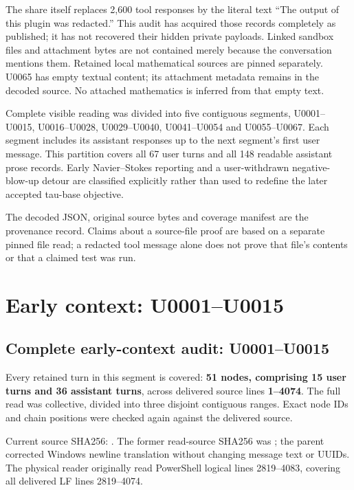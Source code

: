 \documentclass[10pt,a4paper,oneside]{report}
\begin{document}
The share itself replaces 2,600 tool responses by the literal text ``The
output of this plugin was redacted.'' This audit has acquired those
records completely as published; it has not recovered their hidden
private payloads. Linked sandbox files and attachment bytes are not
contained merely because the conversation mentions them. Retained local
mathematical sources are pinned separately. U0065 has empty textual
content; its attachment metadata remains in the decoded source. No
attached mathematics is inferred from that empty text.

Complete visible reading was divided into five contiguous segments,
U0001--U0015, U0016--U0028, U0029--U0040, U0041--U0054 and U0055--U0067.
Each segment includes its assistant responses up to the next segment's
first user message. This partition covers all 67 user turns and all 148
readable assistant prose records. Early Navier--Stokes reporting and a
user-withdrawn negative-blow-up detour are classified explicitly rather
than used to redefine the later accepted tau-base objective.

The decoded JSON, original source bytes and coverage manifest are the
provenance record. Claims about a source-file proof are based on a
separate pinned file read; a redacted tool message alone does not prove
that file's contents or that a claimed test was run.

\clearpage

\chapter{Early context: U0001--U0015}\label{early-context-u0001u0015}

\section{Complete early-context audit:
U0001--U0015}\label{complete-early-context-audit-u0001u0015}

Every retained turn in this segment is covered: \textbf{51 nodes,
comprising 15 user turns and 36 assistant turns}, across delivered
source lines \textbf{1--4074}. The full read was collective, divided
into three disjoint contiguous ranges. Exact node IDs and chain
positions were checked again against the delivered source.

Current source SHA256:
\protect{}.
The former read-source SHA256 was
\protect{};
the parent corrected Windows newline translation without changing
message text or UUIDs. The physical reader originally read PowerShell
logical lines 2819--4083, covering all delivered LF lines 2819--4074.
\end{document}
